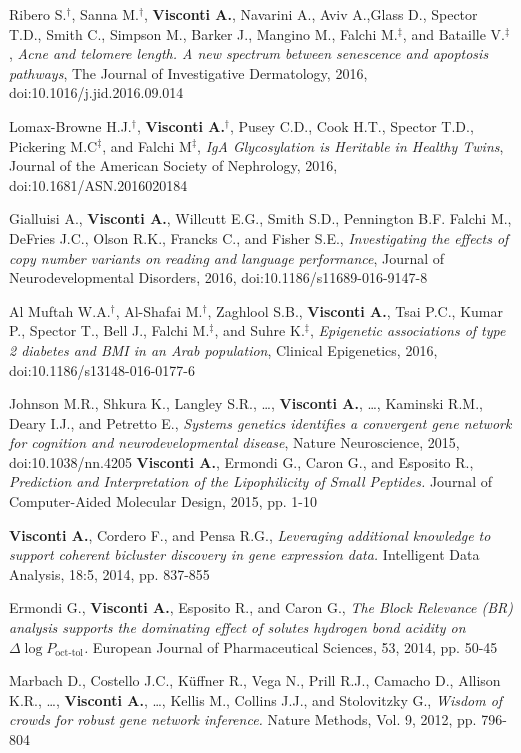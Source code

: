 \documentclass[a4paper,10pt]{article}
\begin{document}
{\begin{itemize}
		 Ribero S.$^{\textbf{$\dag $}}$, Sanna M.$^{\textbf{$\dag $}}$, \textbf{Visconti A.}, Navarini A., Aviv A.,Glass D., Spector T.D., Smith C., Simpson M., Barker J., Mangino M., Falchi M.$^{\textbf{$\ddag $}}$, and Bataille V.$^{\textbf{$\ddag $}}$, \emph{Acne and telomere length. A new spectrum between senescence and apoptosis pathways}, The Journal of Investigative Dermatology, 2016, doi:10.1016/j.jid.2016.09.014 
		
		 Lomax-Browne H.J.$^{\textbf{$\dag $}}$, \textbf{Visconti A.}$^{\textbf{$\dag $}}$, Pusey C.D., Cook H.T., Spector T.D., Pickering M.C$^{\textbf{$\ddag $}}$, and Falchi M$^{\textbf{$\ddag $}}$, \emph{IgA Glycosylation is Heritable in Healthy Twins}, Journal of the American Society of Nephrology, 2016, doi:10.1681/ASN.2016020184 
		
		 Gialluisi A., \textbf{Visconti A.}, Willcutt E.G., Smith S.D., Pennington B.F. Falchi M., DeFries J.C.,  Olson R.K., Francks C., and Fisher S.E., \emph{Investigating the effects of copy number variants on reading and language performance}, Journal of Neurodevelopmental Disorders, 2016, doi:10.1186/s11689-016-9147-8
		
		 Al Muftah W.A.$^{\textbf{$\dag $}}$, Al-Shafai M.$^{\textbf{$\dag $}}$, Zaghlool S.B., \textbf{Visconti A.}, Tsai P.C., Kumar P., Spector T., Bell J., Falchi M.$^{\textbf{$\ddag $}}$, and Suhre K.$^{\textbf{$\ddag $}}$, \emph{Epigenetic associations of type 2 diabetes and BMI in an Arab population}, Clinical Epigenetics, 2016, doi:10.1186/s13148-016-0177-6
		
		 Johnson M.R., Shkura K., Langley S.R., \dots, \textbf{Visconti A.}, \dots, Kaminski R.M., Deary I.J., and Petretto E., \emph{Systems genetics identifies a convergent gene network for cognition and neurodevelopmental disease}, Nature Neuroscience, 2015, doi:10.1038/nn.4205
		\textbf{Visconti A.}, Ermondi G., Caron G., and Esposito R., \emph{Prediction and Interpretation of the Lipophilicity of Small Peptides.} Journal of Computer-Aided Molecular Design, 2015, pp. 1-10
		
		\textbf{Visconti A.}, Cordero F., and Pensa R.G., \emph{Leveraging additional knowledge to support coherent bicluster discovery in gene expression data.} Intelligent Data Analysis, 18:5, 2014, pp. 837-855
		
		Ermondi G., \textbf{Visconti A.}, Esposito R., and Caron G., \emph{The Block Relevance (BR) analysis supports the dominating effect of solutes hydrogen bond acidity on $\Delta \log P_{\text{oct-tol}}$.} European Journal of Pharmaceutical Sciences, 53, 2014, pp. 50-45
		
		 Marbach D., Costello J.C., K\"{u}ffner R., Vega N., Prill R.J., Camacho D., Allison K.R., \dots, \textbf{Visconti A.}, \dots, Kellis M., Collins J.J., and Stolovitzky G., \emph{Wisdom of crowds for robust gene network inference.} Nature Methods, Vol. 9, 2012, pp. 796-804		
		
	\end{itemize}
}
\end{document}
